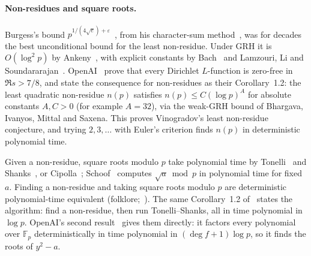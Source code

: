 \documentclass[10pt]{amsart}
\theoremstyle{plain}
\theoremstyle{definition}
\theoremstyle{remark}
\numberwithin{equation}{section}
\begin{document}
\paragraph{Non-residues and square roots.} Burgess's bound $p^{1/(4\sqrt e)+\varepsilon}$~\cite{Bur57},
from his character-sum method~\cite{Bur62}, was for decades the best unconditional bound for the least
non-residue. Under GRH it is $O(\log^2p)$ by Ankeny~\cite{Ank52}, with explicit constants by
Bach~\cite{Bac90} and Lamzouri, Li and Soundararajan~\cite{LLS15}. OpenAI~\cite{OAI003} prove that every
Dirichlet $L$-function is zero-free in $\Re s>7/8$, and state the consequence for non-residues as their
Corollary~1.2: the least quadratic non-residue $n(p)$ satisfies $n(p)\le C(\log p)^A$ for absolute
constants $A,C>0$ (for example $A=32$), via the weak-GRH bound of Bhargava, Ivanyos, Mittal and Saxena.
This proves Vinogradov's least non-residue conjecture, and trying $2,3,\dots$ with Euler's criterion
finds $n(p)$ in deterministic polynomial time.

Given a non-residue, square roots modulo $p$ take polynomial time by Tonelli~\cite{Ton91} and
Shanks~\cite{Sha72}, or Cipolla~\cite{Cip03}; Schoof~\cite{Sch85} computes $\sqrt a\bmod p$ in polynomial time
for fixed $a$. Finding a non-residue and taking square roots modulo $p$ are deterministic polynomial-time
equivalent (folklore;~\cite{BS96}). The same Corollary~1.2 of~\cite{OAI003} states the algorithm: find a
non-residue, then run Tonelli--Shanks, all in time polynomial in $\log p$. OpenAI's second result~\cite{OAI142} gives them directly: it factors every polynomial over
$\mathbb{F}_p$ deterministically in time polynomial in $(\deg f+1)\log p$, so it finds the roots of $y^2-a$.
\end{document}

